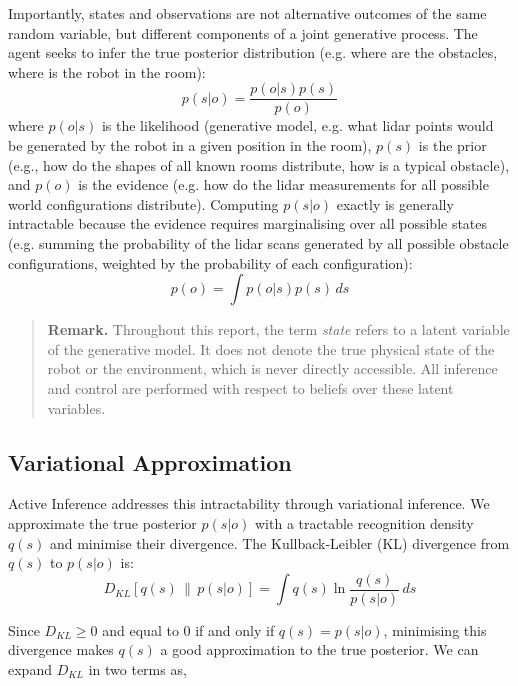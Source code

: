\documentclass[a4paper, twoside]{article}
\begin{document}
Importantly, states and observations are not alternative outcomes of the same
random variable, but different components of a joint generative process.
The agent seeks to infer the true posterior distribution (e.g. where are the obstacles, where is the robot in the room):
%
\begin{equation}
p(s|o) = \frac{p(o|s)p(s)}{p(o)}
\label{eq:bayes}
\end{equation}
%
where $p(o|s)$ is the likelihood (generative model, e.g. what lidar points would be generated by the robot in a given position in the room), $p(s)$ is the prior (e.g., how do the shapes of all known rooms distribute, how is a typical obstacle), and $p(o)$ is the evidence (e.g. how do the lidar measurements for all possible world configurations distribute).
Computing $p(s|o)$ exactly is generally intractable because the evidence requires marginalising over all possible states (e.g. summing the probability of the lidar scans generated by all possible obstacle configurations, weighted by the probability of each configuration):
%
\begin{equation}
p(o) = \int p(o|s)p(s)\,ds
\end{equation}

\begin{quote}
\textbf{Remark.}
Throughout this report, the term \emph{state} refers to a latent variable of the
generative model. It does not denote the true physical state of the robot or the
environment, which is never directly accessible. All inference and control are
performed with respect to beliefs over these latent variables.
\end{quote}


\subsection{Variational Approximation}

Active Inference addresses this intractability through variational inference.
We approximate the true posterior $p(s|o)$ with a tractable recognition density $q(s)$ and minimise their divergence.
The Kullback-Leibler (KL) divergence from $q(s)$ to $p(s|o)$ is:
%
\begin{equation}
D_{KL}[q(s)\,\|\,p(s|o)] = \int q(s) \ln \frac{q(s)}{p(s|o)}\,ds
\label{eq:kl_divergence}
\end{equation}

Since $D_{KL} \geq 0$ and equal to $0$ if and only if $q(s) = p(s|o)$, minimising this divergence makes $q(s)$ a good approximation to the true posterior. We can expand $D_{KL}$ in two terms as, 
\end{document}
